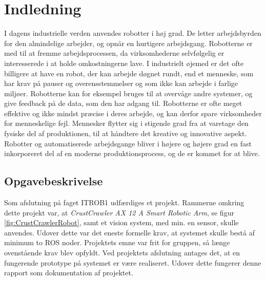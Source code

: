 \chapter{Indledning}\label{chap:Indledning}
I dagens industrielle verden anvendes robotter i høj grad.
De letter arbejdsbyrden for den almindelige arbejder, og opnår en hurtigere arbejdsgang.
Robotterne er med til at fremme arbejdsprocessen, da virksomhederne selvfølgelig er interesserede i at holde omkostningerne lave.
I industrielt øjemed er det ofte billigere at have en robot, der kan arbejde døgnet rundt, end et menneske, som har krav på pauser og overensstemmelser og som ikke kan arbejde i farlige miljøer.
Robotterne kan for eksempel bruges til at overvåge andre systemer, og give feedback på de data, som den har adgang til.
Robotterne er ofte meget effektive og ikke mindst præcise i deres arbejde, og kan derfor spare virksomheder for menneskelige fejl.
Mennesker flytter sig i stigende grad fra at varetage den fysiske del af produktionen, til at håndtere det kreative og innovative aspekt.
Robotter og automatiserede arbejdsgange bliver i højere og højere grad en fast inkorporeret del af en moderne produktionsprocess, og de er kommet for at blive.

\section{Opgavebeskrivelse}\label{sec:Opgavebeskrivelse}
Som afslutning på faget ITROB1 udfærdiges et projekt.
Rammerne omkring dette projekt var, at \textit{CrustCrawler AX 12 A Smart Robotic Arm}, se figur \ref{fig:CrustCrawlerRobot}, samt et vision system, med min. en sensor, skulle anvendes. Udover dette var det eneste formelle krav, at systemet skulle bestå af minimum to ROS noder. 
Projektets emne var frit for gruppen, så længe ovenstående krav blev opfyldt. 
Ved projektets afslutning antages det, at en fungerende prototype på systemet er være realiseret.
Udover dette fungerer denne rapport som dokumentation af projektet.
